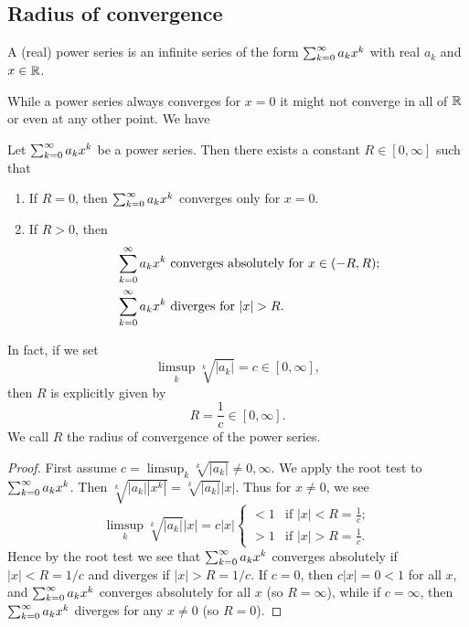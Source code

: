 \documentclass[10pt, a4paper]{article}
\begin{document}
\subsection{Radius of convergence}

\begin{definition}
    A
    (real)
    power series is an infinite series of the form $\infsum[k = 0]a_kx ^ k$ with real $a_k$ and $x \in \R$.
\end{definition}

While a power series always converges for $x = 0$ it might not converge in all of $\R$ or even at any other point.
We have
\begin{theorem}
    Let $\infsumo a_kx ^ k$ be a power series.
    Then there exists a constant $R \in [0, \infty]$ such that
    \begin{enumerate}[label = (\roman*)]
        \item If $R = 0$,
        then $\infsumo a_kx ^ k$ converges only for $x = 0$.
        \item If $R > 0$,
        then
        \begin{align*}
            &\infsumo a_kx ^ k \text{ converges absolutely for $x \in (-R, R)$}; \\
            &\infsumo a_kx ^ k \text{ diverges for $|x| > R$}.
        \end{align*}
    \end{enumerate}
    In fact,
    if we set
    \[
    \limsup_{k}\sqrt[k]{|a_k|} = c \in [0, \infty],
    \]
    then $R$ is explicitly given by
    \[
    R = \frac{1}{c} \in [0, \infty].
    \]
    We call $R$ the radius of convergence of the power series.
    \begin{proof}
        First assume $c = \limsup_{k}\sqrt[k]{|a_k|} \neq 0, \infty$.
        We apply the root test to $\infsumo a_kx ^ k$.
        Then $\sqrt[k]{|a_k||x ^ k|} = \sqrt[k]{|a_k|}|x|$.
        Thus for $x \neq 0$,
        we see
        \[
        \limsup_{k}\sqrt[k]{|a_k|}|x| = c|x| \begin{cases}
            < 1 & \text{if } |x| < R = \frac{1}{c}; \\
            > 1 & \text{if } |x| > R = \frac{1}{c}.
        \end{cases}
        \]
        Hence by the root test we see that $\infsumo a_kx ^ k$ converges absolutely if $|x| < R = 1 / c$ and diverges if $|x| > R = 1 / c$.
        If $c = 0$,
        then $c|x| = 0 < 1$ for all $x$,
        and $\infsumo a_kx ^ k$ converges absolutely for all $x$
        (so $R = \infty$),
        while if $c = \infty$,
        then $\infsumo a_kx ^ k$ diverges for any $x \neq 0$
        (so $R = 0$).
    \end{proof}
\end{theorem}
\end{document}
